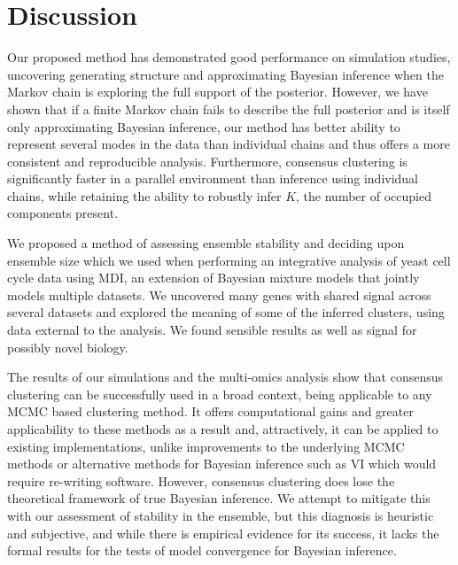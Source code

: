 \documentclass{article}
\begin{document}
\section{Discussion}
Our proposed method has demonstrated good performance on simulation studies, uncovering generating structure and approximating Bayesian inference when the Markov chain is exploring the full support of the posterior. However, we have shown that if a finite Markov chain fails to describe the full posterior and is itself only approximating Bayesian inference, our method has better ability to represent several modes in the data than individual chains and thus offers a more consistent and reproducible analysis. Furthermore, consensus clustering is significantly faster in a parallel environment than inference using individual chains, while retaining the ability to robustly infer $K$, the number of occupied components present. 

We proposed a method of assessing ensemble stability and deciding upon ensemble size which we used when performing an integrative analysis of yeast cell cycle data using MDI, an extension of Bayesian mixture models that jointly models multiple datasets. 
We uncovered many genes with shared signal across several datasets and explored the meaning of some of the inferred clusters, using data external to the analysis. We found sensible results as well as signal for possibly novel biology. 

The results of our simulations and the multi-omics analysis show that consensus clustering can be successfully used in a broad context, being applicable to any MCMC based clustering method. It offers computational gains and greater applicability to these methods as a result and, attractively, it can be applied to existing implementations, unlike improvements to the underlying MCMC methods or alternative methods for Bayesian inference such as VI which would require re-writing software. However, consensus clustering does lose the theoretical framework of true Bayesian inference. We attempt to mitigate this with our assessment of stability in the ensemble, but this diagnosis is heuristic and subjective, and while there is empirical evidence for its success, it lacks the formal results for the tests of model convergence for Bayesian inference.
\end{document}
